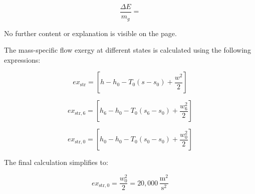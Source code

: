 \[
\frac{\Delta E}{m_g} =
\]  

No further content or explanation is visible on the page.

The mass-specific flow exergy at different states is calculated using the following expressions:

\[
ex_{\text{str}} = \left[ h - h_0 - T_0 (s - s_0) + \frac{w^2}{2} \right]
\]

\[
ex_{\text{str},6} = \left[ h_6 - h_0 - T_0 (s_6 - s_0) + \frac{w_6^2}{2} \right]
\]

\[
ex_{\text{str},0} = \left[ h_0 - h_0 - T_0 (s_0 - s_0) + \frac{w_0^2}{2} \right]
\]

The final calculation simplifies to:

\[
ex_{\text{str},0} = \frac{w_0^2}{2} = 20,000 \, \frac{\text{m}^2}{\text{s}^2}
\]